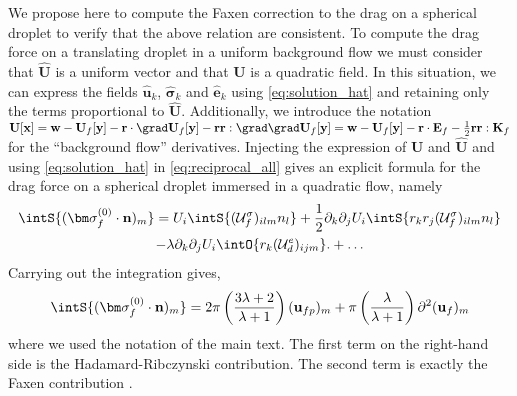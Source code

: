 We propose here to compute the Faxen correction to the drag on a spherical droplet to verify that the above relation are consistent. 
To compute the drag force on a translating droplet in a uniform background flow we must consider that  $\hat{\textbf{U}}$ is a uniform vector and that  ${\textbf{U}}$ is a quadratic field. 
In this situation, we can express the fields $\hat{\textbf{u}}_k$, $\hat{\bm\sigma}_k$ and $\hat{\textbf{e}}_k$ using \ref{eq:solution_hat} and retaining only the terms proportional to $\hat{\textbf{U}}$. 
Additionally, we introduce the notation $\textbf{U}[\textbf{x}] = \textbf{w} - \textbf{U}_f[\textbf{y}] - \textbf{r}\cdot \grad \textbf{U}_f[\textbf{y}] - \textbf{rr}:\grad\grad \textbf{U}_f[\textbf{y}] =  \textbf{w} - \textbf{U}_f[\textbf{y}] - \textbf{r}\cdot \textbf{E}_f - \frac{1}{2}\textbf{rr}: \textbf{K}_f $ for the ``background flow'' derivatives.
Injecting the expression of \textbf{U} and $\hat{\textbf{U}}$ and using \ref{eq:solution_hat} in \ref{eq:reciprocal_all} gives an explicit formula for the drag force on a spherical droplet immersed in a quadratic flow, namely
\begin{multline}
\intS{(\bm\sigma_f^{(0)} \cdot \textbf{n})_m}
    = 
    U_i  \intS{  (\mathcal{U}_f^\sigma)_{ilm}  n_l }
    + \frac{1}{2}\partial_k\partial_j U_i \intS{ r_kr_j (\mathcal{U}_f^\sigma)_{ilm}  n_l }\\
    -\lambda \partial_k\partial_j U_i  \intO{ r_k (\mathcal{U}_d^e)_{ijm} }. 
    + \ldots
    \label{eq:reciprocal_drag}
\end{multline}
Carrying out the integration gives,
\begin{align*}
\intS{(\bm\sigma_f^{(0)} \cdot \textbf{n})_m}
    = 
     2\pi\left(\frac{3\lambda +2 }{\lambda +1}\right)
    (\textbf{u}_{fp}  )_m
    + \pi \left(\frac{\lambda }{\lambda +1}\right)\partial^2 (\textbf{u}_f)_m
\end{align*}
where we used the notation of the main text. 
The first term on the right-hand side is the Hadamard-Ribczynski contribution. 
The second term is exactly the Faxen contribution \citep{kim2013microhydrodynamics}. 

